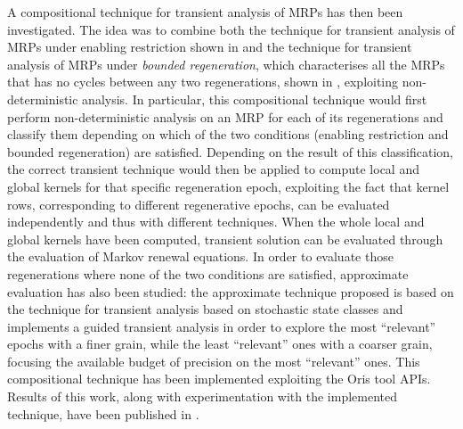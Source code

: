   A compositional technique for transient analysis of \acp{MRP} has then been investigated. The idea was to combine both the technique for transient analysis of \acp{MRP} under enabling restriction shown in \cite{german1995transient} and the technique for transient analysis of \acp{MRP} under \textit{bounded regeneration}, which characterises all the \acp{MRP} that has no cycles between any two regenerations, shown in \cite{horvath2012transient}, exploiting non-deterministic analysis. In particular, this compositional technique would first perform non-deterministic analysis on an \ac{MRP} for each of its regenerations and classify them depending on which of the two conditions (enabling restriction and bounded regeneration) are satisfied. Depending on the result of this classification, the correct transient technique would then be applied to compute local and global kernels for that specific regeneration epoch, exploiting the fact that kernel rows, corresponding to different regenerative epochs, can be evaluated independently and thus with different techniques. When the whole local and global kernels have been computed, transient solution can be evaluated through the evaluation of Markov renewal equations. In order to evaluate those regenerations where none of the two conditions are satisfied, approximate evaluation has also been studied: the approximate technique proposed is based on the technique for transient analysis based on stochastic state classes \cite{horvath2012transient} and implements a guided transient analysis in order to explore the most ``relevant'' epochs with a finer grain, while the least ``relevant'' ones with a coarser grain, focusing the available budget of precision on the most ``relevant'' ones. This compositional technique has been implemented exploiting the Oris tool \acp{API}. Results of this work, along with experimentation with the implemented technique, have been published in \cite{biagi2017exploiting}.
  
